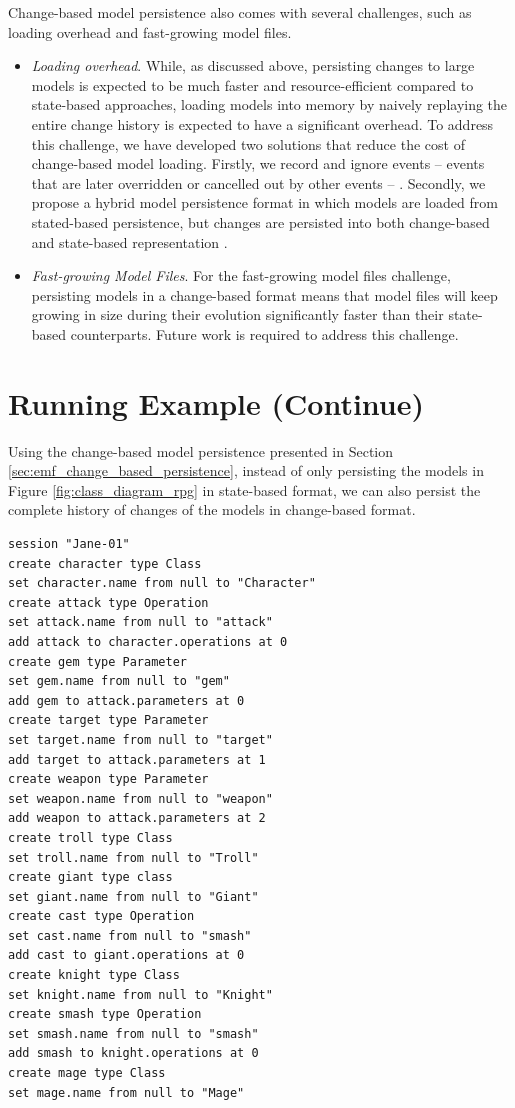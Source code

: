 Change-based model persistence also comes with several challenges, such as loading overhead and fast-growing model files. 
\begin{itemize}
\item \emph{Loading overhead}. While, as discussed above, persisting changes to large models is expected to be much faster and resource-efficient compared to state-based approaches, loading models into memory by naively replaying the entire change history is expected to have a significant overhead. To address this challenge, we have developed two solutions that reduce the cost of change-based model loading. Firstly, we record and ignore events -- events that are later overridden or cancelled out by other events -- \cite{yohannis2018towards}. Secondly, we propose a hybrid model persistence format in which models are loaded from stated-based persistence, but changes are persisted into both change-based and state-based representation \cite{DBLP:conf/models/YohannisRPK18}. 
\item \emph{Fast-growing Model Files}. For the fast-growing model files challenge, persisting models in a change-based format means that model files will keep growing in size during their evolution significantly faster than their state-based counterparts. Future work is required to address this challenge.     
\end{itemize}



\section{Running Example (Continue)}
\label{sec:runnnig_example_continue}
Using the change-based model persistence presented in Section \ref{sec:emf_change_based_persistence}, instead of only persisting the models in Figure \ref{fig:class_diagram_rpg} in state-based format, we can also persist the complete history of changes of the models in change-based format. 

\begin{lstlisting}[style=eol,caption={Change-based representation of the original version in Figure \ref{fig:class_diagram_origin}.},label=lst:cbp_origin]
session "Jane-01"
create character type Class
set character.name from null to "Character" 
create attack type Operation
set attack.name from null to "attack" 
add attack to character.operations at 0
create gem type Parameter
set gem.name from null to "gem" 
add gem to attack.parameters at 0
create target type Parameter
set target.name from null to "target" 
add target to attack.parameters at 1
create weapon type Parameter
set weapon.name from null to "weapon" 
add weapon to attack.parameters at 2
create troll type Class
set troll.name from null to "Troll" 
create giant type class
set giant.name from null to "Giant"
create cast type Operation
set cast.name from null to "smash"
add cast to giant.operations at 0
create knight type Class
set knight.name from null to "Knight"
create smash type Operation
set smash.name from null to "smash"
add smash to knight.operations at 0
create mage type Class
set mage.name from null to "Mage" 
\end{lstlisting}

